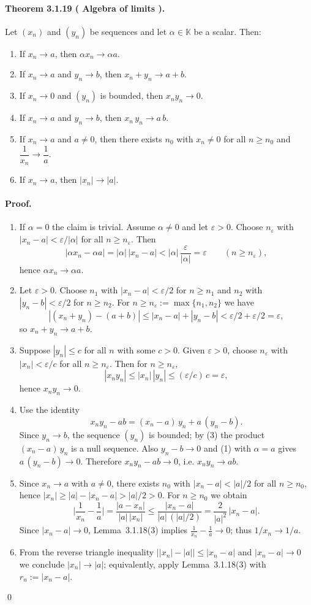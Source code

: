 \documentclass[12pt]{article}
\newcommand{\K}{\mathbb{K}} %
\newcommand{\eps}{\varepsilon}
\newcommand{\NumberedTheorem}[3]{%
\paragraph*{Theorem #1 ( #2 ).} #3\par}
\begin{document}
\NumberedTheorem{3.1.19}{Algebra of limits}{Let $(x_n)$ and $(y_n)$ be sequences and let $\alpha\in\K$ be a scalar. Then:
\begin{enumerate}[label={(\arabic*)}, leftmargin=*]
	\item If $x_n\to a$, then $\alpha x_n\to \alpha a$.
	\item If $x_n\to a$ and $y_n\to b$, then $x_n+y_n\to a+b$.
	\item If $x_n\to 0$ and $(y_n)$ is bounded, then $x_n y_n\to 0$.
	\item If $x_n\to a$ and $y_n\to b$, then $x_n\,y_n\to a\,b$.
	\item If $x_n\to a$ and $a\ne0$, then there exists $n_0$ with $x_n\ne0$ for all $n\ge n_0$ and $\dfrac{1}{x_n}\to \dfrac{1}{a}$.
	\item If $x_n\to a$, then $|x_n|\to |a|$.
\end{enumerate}
\paragraph{Proof.}
\begin{enumerate}[label={(\arabic*)}, leftmargin=*]
	\item If $\alpha=0$ the claim is trivial. Assume $\alpha\ne0$ and let $\eps>0$. Choose $n_\eps$ with $|x_n-a|<\eps/|\alpha|$ for all $n\ge n_\eps$. Then
	\[
		|\alpha x_n-\alpha a| = |\alpha|\,|x_n-a| < |\alpha|\,\frac{\eps}{|\alpha|} = \eps
		\qquad (n\ge n_\eps),
	\]
	hence $\alpha x_n\to \alpha a$.
	\item Let $\eps>0$. Choose $n_1$ with $|x_n-a|<\eps/2$ for $n\ge n_1$ and $n_2$ with $|y_n-b|<\eps/2$ for $n\ge n_2$. For $n\ge n_\eps:=\max\{n_1,n_2\}$ we have
	\[
		|(x_n+y_n)-(a+b)| \le |x_n-a|+|y_n-b| < \eps/2+\eps/2 = \eps,
	\]
	so $x_n+y_n\to a+b$.
	\item Suppose $|y_n|\le c$ for all $n$ with some $c>0$. Given $\eps>0$, choose $n_\eps$ with $|x_n|<\eps/c$ for all $n\ge n_\eps$. Then for $n\ge n_\eps$,
	\[
		|x_n y_n| \le |x_n|\,|y_n| \le (\eps/c)\,c = \eps,
	\]
	hence $x_n y_n\to 0$.
	\item Use the identity
	\[
		 x_n y_n - ab = (x_n-a)\,y_n + a\,(y_n-b).
	\]
	Since $y_n\to b$, the sequence $(y_n)$ is bounded; by (3) the product $(x_n-a)\,y_n$ is a null sequence. Also $y_n-b\to0$ and (1) with $\alpha=a$ gives $a\,(y_n-b)\to0$. Therefore $x_n y_n - ab\to0$, i.e. $x_n y_n\to ab$.
	\item Since $x_n\to a$ with $a\ne0$, there exists $n_0$ with $|x_n-a|<|a|/2$ for all $n\ge n_0$, hence $|x_n|\ge |a|-|x_n-a| > |a|/2>0$. For $n\ge n_0$ we obtain
	\[
		\Big|\frac{1}{x_n}-\frac{1}{a}\Big| = \frac{|a-x_n|}{|a|\,|x_n|}
		\le \frac{|x_n-a|}{|a|\,(|a|/2)} = \frac{2}{|a|^2}\,|x_n-a|.
	\]
	Since $|x_n-a|\to0$, Lemma~3.1.18(3) implies $\frac{1}{x_n}-\frac{1}{a}\to0$; thus $1/x_n\to 1/a$.
	\item From the reverse triangle inequality $\big||x_n|-|a|\big|\le |x_n-a|$ and $|x_n-a|\to0$ we conclude $|x_n|\to |a|$; equivalently, apply Lemma~3.1.18(3) with $r_n:=|x_n-a|$.
\end{enumerate}
\qed}
\end{document}
